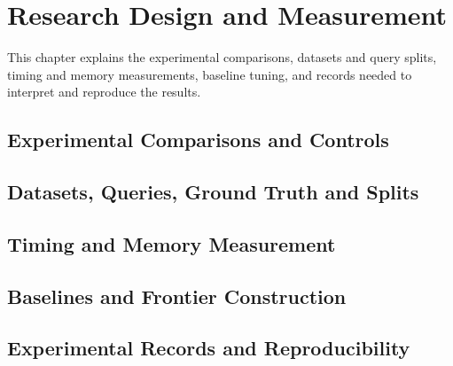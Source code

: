 \chapter{Research Design and Measurement}
\label{ch:methodology}
This chapter explains the experimental comparisons, datasets and query splits,
timing and memory measurements, baseline tuning, and records needed to
interpret and reproduce the results.

\section{Experimental Comparisons and Controls}
\label{sec:3-1}


\section{Datasets, Queries, Ground Truth and Splits}
\label{sec:3-2}


\section{Timing and Memory Measurement}
\label{sec:3-3}


\section{Baselines and Frontier Construction}
\label{sec:3-4}
\label{sec:b-grids}


\section{Experimental Records and Reproducibility}
\label{sec:3-5}

